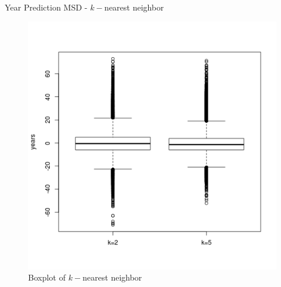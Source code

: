 \begin{frame}{Year Prediction MSD - $k-$nearest neighbor}
		\begin{figure}
		\includegraphics[scale=0.42]{../doc/src/report1/figures/ypmsd_nnr.png}
		\caption{Boxplot of $k-$nearest neighbor}
		\end{figure}
\end{frame}
